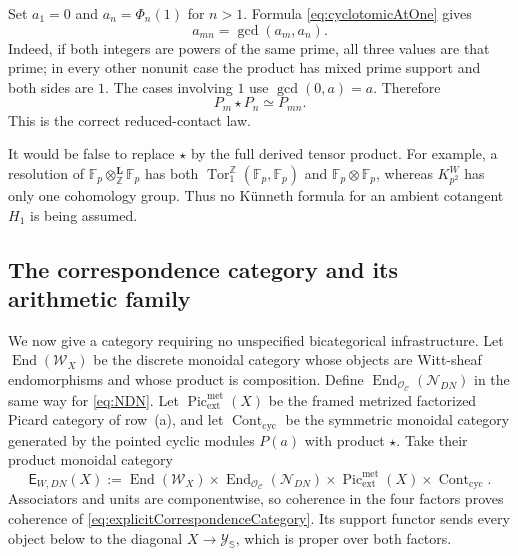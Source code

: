 \documentclass[11pt]{amsart}
\theoremstyle{definition}
\theoremstyle{remark}
\newcommand{\Z}{\mathbb Z}
\begin{document}
Set $a_1=0$ and $a_n=\Phi_n(1)$ for $n>1$.  Formula
\eqref{eq:cyclotomicAtOne} gives
\begin{equation}\label{eq:cyclotomicGcdLaw}
 a_{mn}=\gcd(a_m,a_n).
\end{equation}
Indeed, if both integers are powers of the same prime, all three values are
that prime; in every other nonunit case the product has mixed prime support
and both sides are $1$.  The cases involving $1$ use $\gcd(0,a)=a$.
Therefore
\begin{equation}\label{eq:contactComposition}
 P_m\star P_n\simeq P_{mn}.
\end{equation}
This is the correct reduced-contact law.

It would be false to replace $\star$ by the full derived tensor product.
For example, a resolution of $\mathbb F_p\otimes_\Z^{\mathbf L}\mathbb
F_p$ has both $\operatorname{Tor}_1^\Z(\mathbb F_p,\mathbb F_p)$ and
$\mathbb F_p\otimes\mathbb F_p$, whereas $K_{p^2}^W$ has only one
cohomology group.  Thus no K\"unneth formula for an ambient cotangent
$H_1$ is being assumed.

\subsection{The correspondence category and its arithmetic family}

We now give a category requiring no unspecified bicategorical
infrastructure.  Let $\operatorname{End}(\mathcal W_X)$ be the discrete
monoidal category whose objects are Witt-sheaf endomorphisms and whose
product is composition.  Define
$\operatorname{End}_{\mathcal O_{\mathcal C}}(\mathcal N_{DN})$ in the
same way for \eqref{eq:NDN}.  Let
$\operatorname{Pic}^{\mathrm{met}}_{\mathrm{ext}}(X)$ be the framed
metrized factorized Picard category of row~(a), and let
$\operatorname{Cont}_{\mathrm{cyc}}$ be the symmetric monoidal category
generated by the pointed cyclic modules $P(a)$ with product $\star$.
Take their product monoidal category
\begin{equation}\label{eq:explicitCorrespondenceCategory}
 \mathsf E_{W,DN}(X):=
 \operatorname{End}(\mathcal W_X)\times
 \operatorname{End}_{\mathcal O_{\mathcal C}}(\mathcal N_{DN})\times
 \operatorname{Pic}^{\mathrm{met}}_{\mathrm{ext}}(X)\times
 \operatorname{Cont}_{\mathrm{cyc}}.
\end{equation}
Associators and units are componentwise, so coherence in the four factors
proves coherence of \eqref{eq:explicitCorrespondenceCategory}.
Its support functor sends every object below to the diagonal
$X\to\mathscr Y_{\mathbb S}$, which is proper over both factors.
\end{document}
